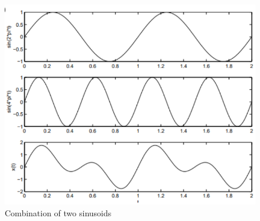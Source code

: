 \documentclass[10pt,a4paper]{report}
\theoremstyle{definition}
\begin{document}
\begin{figure}[h]
	\centering\includegraphics[scale=0.40]{images/Pasted image 20230506094754.png}
	\caption{Combination of two sinusoids}
	\label{sinusoid-combo}
\end{figure}
\end{document}
